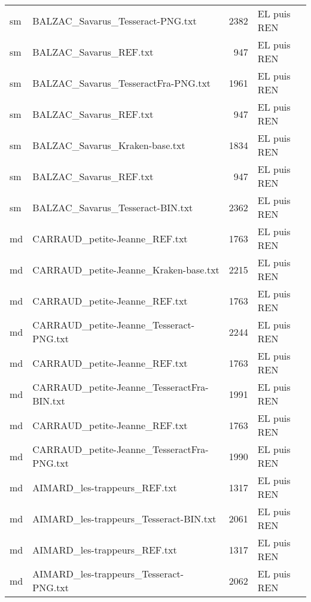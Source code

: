 \begin{tabular}{llrl}
    sm &                   BALZAC\_Savarus\_Tesseract-PNG.txt &                  2382 & EL puis REN \\
    sm &                             BALZAC\_Savarus\_REF.txt &                   947 & EL puis REN \\
    sm &                BALZAC\_Savarus\_TesseractFra-PNG.txt &                  1961 & EL puis REN \\
    sm &                             BALZAC\_Savarus\_REF.txt &                   947 & EL puis REN \\
    sm &                     BALZAC\_Savarus\_Kraken-base.txt &                  1834 & EL puis REN \\
    sm &                             BALZAC\_Savarus\_REF.txt &                   947 & EL puis REN \\
    sm &                   BALZAC\_Savarus\_Tesseract-BIN.txt &                  2362 & EL puis REN \\
    md &                      CARRAUD\_petite-Jeanne\_REF.txt &                  1763 & EL puis REN \\
    md &              CARRAUD\_petite-Jeanne\_Kraken-base.txt &                  2215 & EL puis REN \\
    md &                      CARRAUD\_petite-Jeanne\_REF.txt &                  1763 & EL puis REN \\
    md &            CARRAUD\_petite-Jeanne\_Tesseract-PNG.txt &                  2244 & EL puis REN \\
    md &                      CARRAUD\_petite-Jeanne\_REF.txt &                  1763 & EL puis REN \\
    md &         CARRAUD\_petite-Jeanne\_TesseractFra-BIN.txt &                  1991 & EL puis REN \\
    md &                      CARRAUD\_petite-Jeanne\_REF.txt &                  1763 & EL puis REN \\
    md &         CARRAUD\_petite-Jeanne\_TesseractFra-PNG.txt &                  1990 & EL puis REN \\
    md &                       AIMARD\_les-trappeurs\_REF.txt &                  1317 & EL puis REN \\
    md &             AIMARD\_les-trappeurs\_Tesseract-BIN.txt &                  2061 & EL puis REN \\
    md &                       AIMARD\_les-trappeurs\_REF.txt &                  1317 & EL puis REN \\
    md &             AIMARD\_les-trappeurs\_Tesseract-PNG.txt &                  2062 & EL puis REN \\

\end{tabular}
